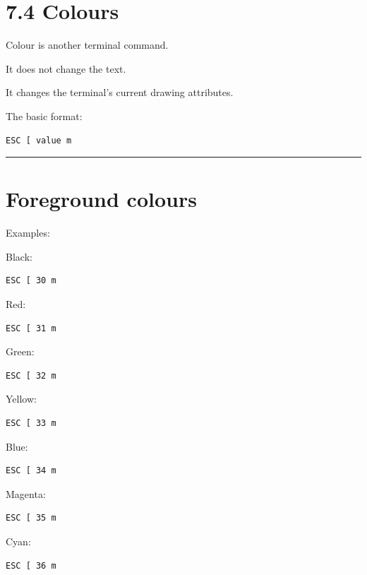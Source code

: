\documentclass[
  oneside,
  openany]{book}
\begin{document}
\hypertarget{colours}{%
\section{7.4 Colours}\label{colours}}

Colour is another terminal command.

It does not change the text.

It changes the terminal's current drawing attributes.

The basic format:

\begin{verbatim}
ESC [ value m
\end{verbatim}

\begin{center}\rule{0.5\linewidth}{0.5pt}\end{center}

\hypertarget{foreground-colours}{%
\section{Foreground colours}\label{foreground-colours}}

Examples:

Black:

\begin{verbatim}
ESC [ 30 m
\end{verbatim}

Red:

\begin{verbatim}
ESC [ 31 m
\end{verbatim}

Green:

\begin{verbatim}
ESC [ 32 m
\end{verbatim}

Yellow:

\begin{verbatim}
ESC [ 33 m
\end{verbatim}

Blue:

\begin{verbatim}
ESC [ 34 m
\end{verbatim}

Magenta:

\begin{verbatim}
ESC [ 35 m
\end{verbatim}

Cyan:

\begin{verbatim}
ESC [ 36 m
\end{verbatim}
\end{document}
